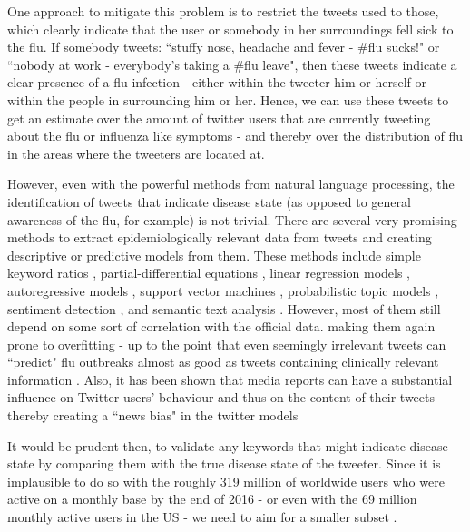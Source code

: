 \documentclass[11pt, a4paper]{report}\usepackage[]{graphicx}\usepackage[]{color}
\begin{document}
One approach to mitigate this problem is to restrict the tweets used to those, which clearly indicate that the user or somebody in her surroundings fell sick to the flu. If somebody tweets: ``stuffy nose, headache and fever - \#flu sucks!" or ``nobody at work - everybody's taking a \#flu leave", then these tweets indicate a clear presence of a flu infection - either within the tweeter him or herself or within the people in surrounding him or her. Hence, we can use these tweets to get an estimate over the amount of twitter users that are currently tweeting about the flu or influenza like symptoms - and thereby over the distribution of flu in the areas where the tweeters are located at.\newline

However, even with the powerful methods from natural language processing, the identification of tweets that indicate disease state (as opposed to general awareness of the flu, for example) is not trivial. There are several very promising methods to extract epidemiologically relevant data from tweets and creating descriptive or predictive models from them. These methods include simple keyword ratios \citep{lampos_tracking_2010}, partial-differential equations \citep{wang_regional_2016}, linear regression models \citep{culotta_towards_2010}, autoregressive models \citep{achrekar_predicting_2011,paul_twitter_2014,paul_worldwide_2015}, support vector machines \citep{paul_you_2011}, probabilistic topic models \citep{paul_you_2011}, sentiment detection \citep{aramaki_twitter_2011}, and semantic text analysis \citep{lamb_separating_2013}. However, most of them still depend on some sort of correlation with the official data. making them again prone to overfitting - up to the point that even seemingly irrelevant tweets can ``predict" flu outbreaks almost as good as tweets containing clinically relevant information \citep{bodnar_validating_2013}. Also, it has been shown that media reports can have a substantial influence on Twitter users' behaviour and thus on the content of their tweets - thereby creating a ``news bias" in the twitter models \citep{aramaki_twitter_2011}\newline

It would be prudent then, to validate any keywords that might indicate disease state by comparing them with the true disease state of the tweeter. Since it is implausible to do so with the roughly 319 million of worldwide users who were active on a monthly base by the end of 2016 - or even with the 69 million monthly active users in the US - we need to aim for a smaller subset \citep{twitter_annual_2017}.\newline
\end{document}
